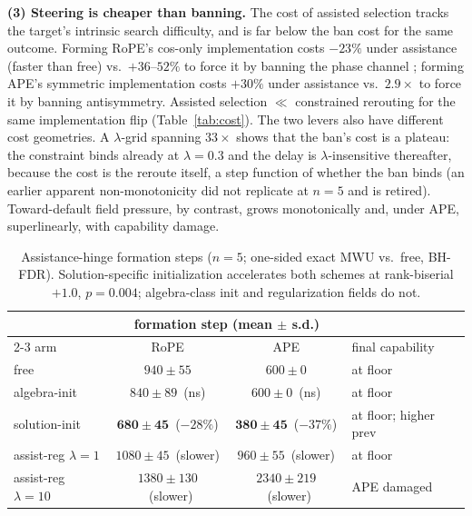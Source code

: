 \documentclass[11pt]{article}
\newcommand{\Rope}{RoPE\xspace}
\begin{document}
\textbf{(3) Steering is cheaper than banning.} The cost of assisted selection tracks the target's intrinsic
search difficulty, and is far below the ban cost for the same outcome. Forming RoPE's cos-only implementation costs
$-23\%$ under assistance (faster than free) vs.\ $+36$--$52\%$ to force it by banning the phase channel
\citep{li2026fingerprint}; forming APE's symmetric implementation costs $+30\%$ under assistance vs.\ $2.9\times$ to force it by
banning antisymmetry. Assisted selection $\ll$ constrained rerouting for the same implementation flip
(Table~\ref{tab:cost}). The two levers also have different cost geometries. A $\lambda$-grid spanning
$33\times$ shows that the ban's cost is a plateau: the constraint binds already at $\lambda{=}0.3$ and the delay
is $\lambda$-insensitive thereafter, because the cost is the reroute itself, a step function of whether the ban
binds (an earlier apparent non-monotonicity did not replicate at $n{=}5$ and is retired). Toward-default field
pressure, by contrast, grows monotonically and, under APE, superlinearly, with capability damage.

\begin{table}[t]\centering\small\setlength{\tabcolsep}{5pt}
\begin{tabular}{l cc l}\toprule
 & \multicolumn{2}{c}{formation step (mean$\,\pm\,$s.d.)} & \\
\cmidrule(lr){2-3}
arm & \Rope & APE & final capability\\\midrule
free & $940\pm55$ & $600\pm0$ & at floor\\
algebra-init & $840\pm89$~(ns) & $600\pm0$~(ns) & at floor\\
solution-init & $\mathbf{680\pm45}$~($-28\%$) & $\mathbf{380\pm45}$~($-37\%$) & at floor; higher prev\\
assist-reg $\lambda{=}1$ & $1080\pm45$~(slower) & $960\pm55$~(slower) & at floor\\
assist-reg $\lambda{=}10$ & $1380\pm130$~(slower) & $2340\pm219$~(slower) & APE damaged\\
\bottomrule\end{tabular}
\caption{Assistance-hinge formation steps ($n{=}5$; one-sided exact MWU vs.\ free, BH-FDR). Solution-specific
initialization accelerates both schemes at rank-biserial $+1.0$, $p{=}0.004$; algebra-class init and
regularization fields do not.}
\label{tab:m12}
\end{table}
\end{document}

